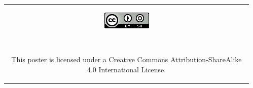 \documentclass[25pt, margin=0mm, innermargin=15mm, blockverticalspace=15mm, colspace=15mm, subcolspace=8mm]{tikzposter}
\begin{document}
\begin{columns}
{\vspace{0.3cm}

\textcolor{gray}{
\hrulefill
}

\vspace{0.1cm}

\newcommand{\qrcodesize}{0.05\linewidth}


\begin{center}
\begin{tabular}{c}



\begin{minipage}{0.1\linewidth}
\href{http://creativecommons.org/licenses/by-sa/4.0/}{\includegraphics[width=\textwidth]{ccbysa}}
\end{minipage}
~
\begin{minipage}{0.7\linewidth}
\small This poster is licensed under a Creative Commons Attribution-ShareAlike 4.0 International License.
\end{minipage}

\end{tabular}
\end{center}

\vspace{-0.05cm}
}





\end{columns}
\end{document}
